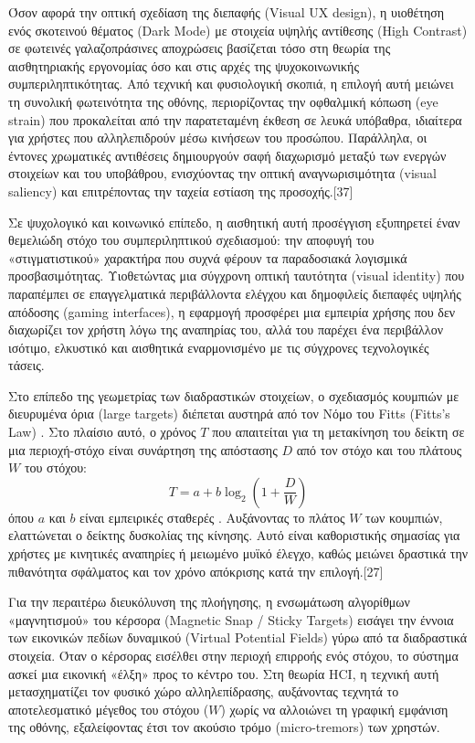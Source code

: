 \documentclass[twoside, a4paper, 11pt]{article}
\newcommand{\textlatin}[1]{\textenglish{#1}}
\begin{document}
Όσον αφορά την οπτική σχεδίαση της διεπαφής (\textlatin{Visual UX design}), η υιοθέτηση ενός σκοτεινού θέματος (\textlatin{Dark Mode}) με στοιχεία υψηλής αντίθεσης (\textlatin{High Contrast}) σε φωτεινές γαλαζοπράσινες 
αποχρώσεις βασίζεται τόσο στη θεωρία της αισθητηριακής εργονομίας όσο και στις αρχές της ψυχοκοινωνικής συμπεριληπτικότητας. Από τεχνική και φυσιολογική σκοπιά, η επιλογή αυτή μειώνει τη συνολική φωτεινότητα της οθόνης, 
περιορίζοντας την οφθαλμική κόπωση (\textlatin{eye strain}) που προκαλείται από την παρατεταμένη έκθεση σε λευκά υπόβαθρα, ιδιαίτερα για χρήστες που αλληλεπιδρούν μέσω κινήσεων του προσώπου. Παράλληλα, οι έντονες χρωματικές αντιθέσεις 
δημιουργούν σαφή διαχωρισμό μεταξύ των ενεργών στοιχείων και του υποβάθρου, ενισχύοντας την οπτική αναγνωρισιμότητα (\textlatin{visual saliency}) και επιτρέποντας την ταχεία εστίαση της προσοχής.[37]

Σε ψυχολογικό και κοινωνικό επίπεδο, η αισθητική αυτή προσέγγιση εξυπηρετεί έναν θεμελιώδη στόχο του συμπεριληπτικού σχεδιασμού: την αποφυγή του «στιγματιστικού» χαρακτήρα που συχνά φέρουν τα παραδοσιακά λογισμικά προσβασιμότητας. 
Υιοθετώντας μια σύγχρονη οπτική ταυτότητα (\textlatin{visual identity}) που παραπέμπει σε επαγγελματικά περιβάλλοντα ελέγχου και δημοφιλείς διεπαφές υψηλής απόδοσης (\textlatin{gaming interfaces}), 
η εφαρμογή προσφέρει μια εμπειρία χρήσης που δεν διαχωρίζει τον χρήστη λόγω της αναπηρίας του, αλλά του παρέχει ένα περιβάλλον ισότιμο, ελκυστικό και αισθητικά εναρμονισμένο με τις σύγχρονες τεχνολογικές τάσεις.

Στο επίπεδο της γεωμετρίας των διαδραστικών στοιχείων, ο σχεδιασμός κουμπιών με διευρυμένα όρια (\textlatin{large targets}) διέπεται αυστηρά από τον Νόμο του \textlatin{Fitts} (\textlatin{Fitts's Law}) \cite{fitts1954information, soukoreff2004fitts}. Στο πλαίσιο αυτό, ο χρόνος $T$ που απαιτείται για τη μετακίνηση του δείκτη σε μια περιοχή-στόχο είναι συνάρτηση της απόστασης $D$ από τον στόχο και του πλάτους $W$ του στόχου:
\begin{equation}
T = a + b \log_2 \left(1 + \frac{D}{W}\right)
\end{equation}
όπου $a$ και $b$ είναι εμπειρικές σταθερές \cite{soukoreff2004fitts}. Αυξάνοντας το πλάτος $W$ των κουμπιών, ελαττώνεται ο δείκτης δυσκολίας της κίνησης. Αυτό είναι καθοριστικής σημασίας για χρήστες με κινητικές αναπηρίες ή μειωμένο μυϊκό έλεγχο, καθώς μειώνει δραστικά την πιθανότητα σφάλματος και τον χρόνο απόκρισης κατά την επιλογή.[27]

Για την περαιτέρω διευκόλυνση της πλοήγησης, η ενσωμάτωση αλγορίθμων «μαγνητισμού» του κέρσορα (\textlatin{Magnetic Snap / Sticky Targets}) εισάγει την έννοια των εικονικών πεδίων δυναμικού (\textlatin{Virtual Potential Fields}) γύρω από τα διαδραστικά στοιχεία. 
Όταν ο κέρσορας εισέλθει στην περιοχή επιρροής ενός στόχου, το σύστημα ασκεί μια εικονική «έλξη» προς το κέντρο του. Στη θεωρία HCI, η τεχνική αυτή μετασχηματίζει τον φυσικό χώρο αλληλεπίδρασης, αυξάνοντας τεχνητά το αποτελεσματικό μέγεθος του στόχου ($W$) χωρίς να αλλοιώνει τη γραφική 
εμφάνιση της οθόνης, εξαλείφοντας έτσι τον ακούσιο τρόμο (\textlatin{micro-tremors}) των χρηστών.
\end{document}
